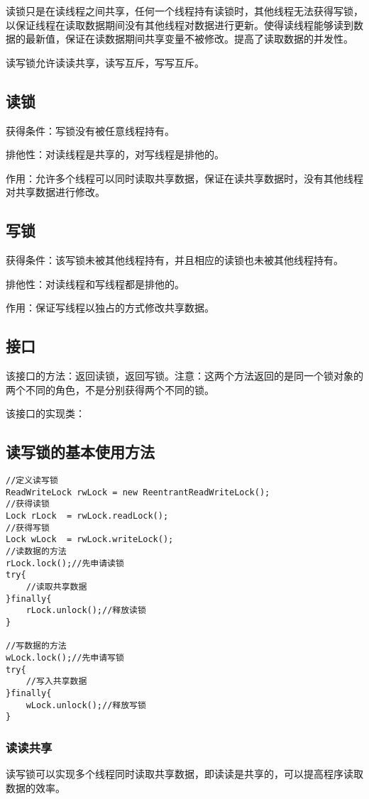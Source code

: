 \documentclass[a4paper]{report}
\begin{document}
读锁只是在读线程之间共享，任何一个线程持有读锁时，其他线程无法获得写锁，以保证线程在读取数据期间没有其他线程对数据进行更新。使得读线程能够读到数据的最新值，保证在读数据期间共享变量不被修改。提高了读取数据的并发性。

读写锁允许读读共享，读写互斥，写写互斥。
\subsection{读锁}
获得条件：写锁没有被任意线程持有。

排他性：对读线程是共享的，对写线程是排他的。

作用：允许多个线程可以同时读取共享数据，保证在读共享数据时，没有其他线程对共享数据进行修改。
\subsection{写锁}
获得条件：该写锁未被其他线程持有，并且相应的读锁也未被其他线程持有。

排他性：对读线程和写线程都是排他的。

作用：保证写线程以独占的方式修改共享数据。
\subsection{接口}
该接口的方法：返回读锁，返回写锁。注意：这两个方法返回的是同一个锁对象的两个不同的角色，不是分别获得两个不同的锁。

该接口的实现类：
\subsection{读写锁的基本使用方法}

\begin{Verbatim}[frame=single,numbersep=5pt,xleftmargin=1.5em,xrightmargin=1.5em]
//定义读写锁
ReadWriteLock rwLock = new ReentrantReadWriteLock();
//获得读锁
Lock rLock  = rwLock.readLock();
//获得写锁
Lock wLock  = rwLock.writeLock();
//读数据的方法
rLock.lock();//先申请读锁
try{
    //读取共享数据
}finally{
    rLock.unlock();//释放读锁
}

//写数据的方法
wLock.lock();//先申请写锁
try{
    //写入共享数据
}finally{
    wLock.unlock();//释放写锁
}
\end{Verbatim}



\subsubsection{读读共享}
读写锁可以实现多个线程同时读取共享数据，即读读是共享的，可以提高程序读取数据的效率。
\end{document}
